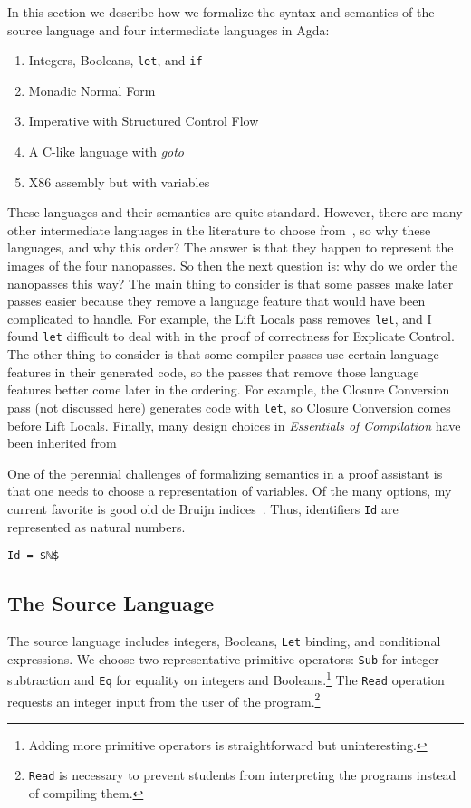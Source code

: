 \documentclass[sigplan,review,dvipsnames,screen,10pt]{acmart}
\begin{document}
In this section we describe how we formalize the syntax and semantics
of the source language and four intermediate languages in Agda:
\begin{enumerate}
\item Integers, Booleans, \texttt{let}, and \texttt{if}
\item Monadic Normal Form
\item Imperative with Structured Control Flow
\item A C-like language with \emph{goto}
\item X86 assembly but with variables
\end{enumerate}
These languages and their semantics are quite standard. However, there
are many other intermediate languages in the literature to choose
from~\citep{Flanagan:1993cg,Hatcliff:1994vn,Kelsey:1995uq,Birkedal:1996aa},
so why these languages, and why this order?  The answer is that they
happen to represent the images of the four nanopasses.  So then the
next question is: why do we order the nanopasses this way? The main
thing to consider is that some passes make later passes easier because
they remove a language feature that would have been complicated to
handle. For example, the Lift Locals pass removes \texttt{let}, and I
found \texttt{let} difficult to deal with in the proof of correctness
for Explicate Control. The other thing to consider is that some
compiler passes use certain language features in their generated code,
so the passes that remove those language features better come later in
the ordering.  For example, the Closure Conversion pass (not discussed
here) generates code with \texttt{let}, so Closure Conversion comes
before Lift Locals. Finally, many design choices in \emph{Essentials
of Compilation} have been inherited from \citet{Dybvig:2010aa}

One of the perennial challenges of formalizing semantics in a proof
assistant is that one needs to choose a representation of variables.
Of the many options, my current favorite is good old de Bruijn
indices~\citep{Bruijn:1972kx}.  Thus, identifiers \lstinline{Id} are
represented as natural numbers.
\begin{lstlisting}
Id = $ℕ$
\end{lstlisting}

\subsection{The Source Language}

The source language includes integers, Booleans, \texttt{Let} binding,
and conditional expressions. We choose two representative primitive
operators: \texttt{Sub} for integer subtraction and \texttt{Eq} for
equality on integers and Booleans.\footnote{Adding more primitive
operators is straightforward but uninteresting.}  The \texttt{Read}
operation requests an integer input from the user of the
program.\footnote{\texttt{Read} is necessary to prevent students from
interpreting the programs instead of compiling them.}
\end{document}
